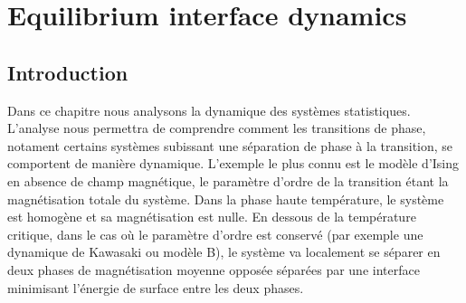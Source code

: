 \chapter{Equilibrium interface dynamics}
\section{Introduction}

Dans ce chapitre nous analysons la dynamique des systèmes statistiques. L'analyse nous permettra de comprendre comment les transitions de phase, notament certains systèmes subissant une séparation de phase à la transition, se comportent de manière dynamique. L'exemple le plus connu est le modèle d'Ising en absence de champ magnétique, le paramètre d'ordre de la transition étant la magnétisation totale du système. Dans la phase haute température, le système est homogène et sa magnétisation est nulle. En dessous de la température critique, dans le cas où le paramètre d'ordre est conservé (par exemple une dynamique de Kawasaki ou modèle B), le système va localement se séparer en deux phases de magnétisation moyenne opposée séparées par une interface minimisant l'énergie de surface entre les deux phases. 

